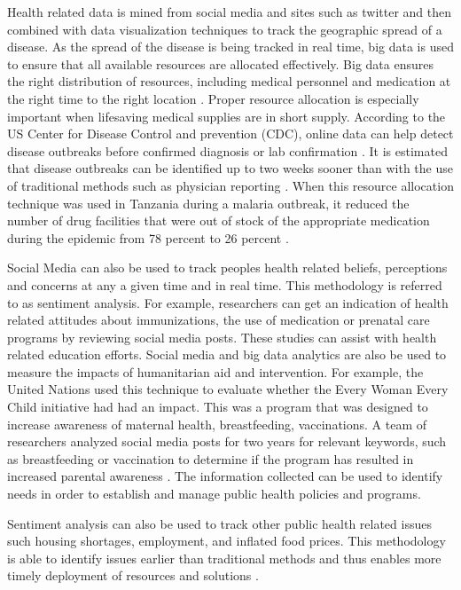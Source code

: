 \documentclass[sigconf]{acmart}
\begin{document}
Health related data is mined from social media and sites such as twitter and then combined with data visualization techniques to track the geographic spread of a disease. As the spread of the disease is being tracked in real time, big data is used to ensure that all available resources are allocated effectively. Big data ensures the right distribution of resources, including medical personnel and medication at the right time to the right location \cite{www-google-Dataflo}. Proper resource allocation is especially important when lifesaving medical supplies are in short supply. According to the US Center for Disease Control and prevention (CDC), online data can help detect disease outbreaks before confirmed diagnosis or lab confirmation \cite{www-google-GloPls}. It is estimated that disease outbreaks can be identified up to two weeks sooner than with the use of traditional methods such as physician reporting \cite{DevEcon}.  When this resource allocation technique was used in Tanzania during a malaria outbreak, it reduced the number of drug facilities that were out of stock of the appropriate medication during the epidemic from 78 percent to 26 percent \cite{DevEcon}.

Social Media can also be used to track peoples health related beliefs, perceptions and concerns at any a given time and in real time. This methodology is referred to as sentiment analysis. For example, researchers can get an indication of health related attitudes about immunizations, the use of medication or prenatal care programs by reviewing social media posts.  These studies can assist with health related education efforts. Social media and big data analytics are also be used to measure the impacts of humanitarian aid and intervention. For example, the United Nations used this technique to evaluate whether the Every Woman Every Child initiative had had an impact. This was a program that was designed to increase awareness of maternal health, breastfeeding, vaccinations. A team of researchers analyzed social media posts for two years for relevant keywords, such as breastfeeding or vaccination to determine if the program has resulted in increased parental awareness \cite{DevEcon}. The information collected can be used to identify needs in order to establish and manage public health policies and programs.

Sentiment analysis can also be used to track other public health related issues such housing shortages, employment, and inflated food prices. This methodology is able to identify issues earlier than traditional methods and thus enables more timely deployment of resources and solutions \cite{www-google-GloPls}. 
\end{document}
